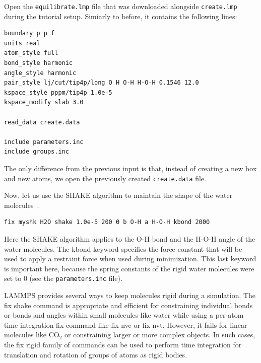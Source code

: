 \documentclass[9pt,tutorial]{livecoms}
\newcommand{\lmpcmd}[1]{\colorbox{listing}{\textcolor{command}{\small{#1}}}} %
\newcommand{\flecmd}[1]{\textcolor{command}{\texttt{#1}}} %
\begin{document}
Open the \flecmd{equilibrate.lmp} file that was downloaded alongside
\flecmd{create.lmp} during the tutorial setup.  {\color{blue} Simiarly
to before, it} contains the following lines:
\begin{lstlisting}
boundary p p f
units real
atom_style full
bond_style harmonic
angle_style harmonic
pair_style lj/cut/tip4p/long O H O-H H-O-H 0.1546 12.0
kspace_style pppm/tip4p 1.0e-5
kspace_modify slab 3.0

read_data create.data

include parameters.inc
include groups.inc
\end{lstlisting}
The only difference from the previous input is that, instead of creating a new
box and new atoms, we open the previously created \flecmd{create.data} file.

Now, let us use the SHAKE algorithm to maintain the shape of the
water molecules~\cite{ryckaert1977numerical, andersen1983rattle}.
\begin{lstlisting}
fix myshk H2O shake 1.0e-5 200 0 b O-H a H-O-H kbond 2000
\end{lstlisting}
Here the SHAKE algorithm applies to the \lmpcmd{O-H} bond and the \lmpcmd{H-O-H} angle
of the water molecules.  The \lmpcmd{kbond} keyword specifies the force constant that will be
used to apply a restraint force when used during minimization.  This last keyword is important
here, because the spring constants of the rigid water molecules were set
to 0 (see the \flecmd{parameters.inc} file).

\begin{note}
{\color{blue}
LAMMPS provides several ways to keep molecules rigid during a simulation.
The \lmpcmd{fix shake} command is appropriate and efficient for constraining
individual bonds or bonds and angles within small molecules like water while using
a per-atom time integration fix command like \lmpcmd{fix nve} or \lmpcmd{fix nvt}.
However, it fails for linear molecules like CO$_2$ or constraining larger or more
complex objects.
In such cases, the \lmpcmd{fix rigid} family of commands can be used to perform
time integration for translation and rotation of groups of atoms as rigid bodies.}
\end{note}
\end{document}
